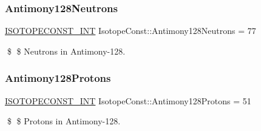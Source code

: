 \subsubsection{\texorpdfstring{Antimony128\+Neutrons}{Antimony128Neutrons}}
{\footnotesize\ttfamily \mbox{\hyperlink{group___isotope_const-_macros_ga5f18360b3e99483a35c32d789e62621c}{I\+S\+O\+T\+O\+P\+E\+C\+O\+N\+S\+T\+\_\+\+I\+NT}} Isotope\+Const\+::\+Antimony128\+Neutrons = 77}

\$ \$ Neutrons in Antimony-\/128. \mbox{\label{group___isotope_const-_antimony-_sb128_ga0d007eee71f185a7c3af4851029e61eb}} 
\subsubsection{\texorpdfstring{Antimony128\+Protons}{Antimony128Protons}}
{\footnotesize\ttfamily \mbox{\hyperlink{group___isotope_const-_macros_ga5f18360b3e99483a35c32d789e62621c}{I\+S\+O\+T\+O\+P\+E\+C\+O\+N\+S\+T\+\_\+\+I\+NT}} Isotope\+Const\+::\+Antimony128\+Protons = 51}

\$ \$ Protons in Antimony-\/128. 